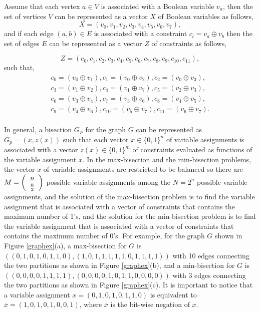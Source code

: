 \documentclass[a4paper]{article}
\begin{document}
Assume that each vertex $a \in V$ is associated 
with a Boolean variable $v_a$, then the set of vertices $V$ can be represented as a vector $X$ of Boolean variables as follows, 
\begin{equation}
X=(v_0,v_1,v_2,v_3,v_4,v_5,v_6,v_7),
\end{equation}
\noindent  
and if each edge $(a, b) \in E$ is associated with a constraint $c_l=v_a\oplus v_b$ 
then the set of edges $E$ can be represented as a vector $Z$ of constraints as follows,

\begin{equation}
Z=(c_0,c_1,c_2,c_3,c_4,c_5,c_6,c_7,c_8,c_9,c_{10},c_{11}), 
\end{equation}
\noindent
such that,
\begin{equation}
\begin{array}{l}
c_0= (v_0\oplus v_1), c_1= (v_0\oplus v_2), c_2= (v_0\oplus v_3),\\ 
c_3= (v_1\oplus v_2), c_4= (v_1\oplus v_7), c_5= (v_2\oplus v_3), \\
c_6= (v_3\oplus v_4), c_7= (v_3\oplus v_6), c_8= (v_4\oplus v_5), \\
c_9= (v_4\oplus v_6), c_{10}= (v_5 \oplus v_7), c_{11}= (v_6\oplus v_7).\\ 
\end{array}
\end{equation}

In general, a bisection $G_P$ for the graph $G$ can be represented as $G_p = (x ,z(x))$ such that 
each vector $x \in \{0,1\}^n $ of variable assignments is associated with a vector $z(x)\in \{0,1\}^m$ of constraints 
evaluated as functions of the variable assignment $x$. In the max-bisection and the min-bisection problems, 
the vector $x$ of variable assignments are restricted to be balanced so there are 
$M = \left( {\begin{array}{*{20}c}
   n  \\
   {{\textstyle{n \over 2}}}  \\
\end{array}} \right)$ possible variable assignments among the $N=2^n$ possible variable assignments, 
and the solution of the max-bisection problem is to find 
the variable assignment that is associated with a vector of constraints that contains the maximum number of 1's, and 
the solution for the min-bisection problem is to find 
the variable assignment that is associated with a vector of constraints that contains the maximum number of 0's. 
For example, for the graph $G$ shown in Figure \ref{graphex}(a), a max-bisection for $G$ is 
$((0,1,0,1,0,1,1,0),(1,0,1,1,1,1,1,0,1,1,1,1))$ with 10 edges connecting the two partitions as shown in Figure \ref{graphex}(b), 
and a min-bisection for $G$ is 
$((0,0,0,0,1,1,1,1),(0,0,0,0,1,0,1,1,0,0,0,0))$ with 3 edges connecting the two partitions as shown in Figure \ref{graphex}(c). 
It is important to notice that a variable assignment $x= (0,1,0,1,0,1,1,0)$ is equivalent to 
$\overline x= (1,0,1,0,1,0,0,1)$, where $\overline x$ is the bit-wise negation of $x$.
 
\end{document}
